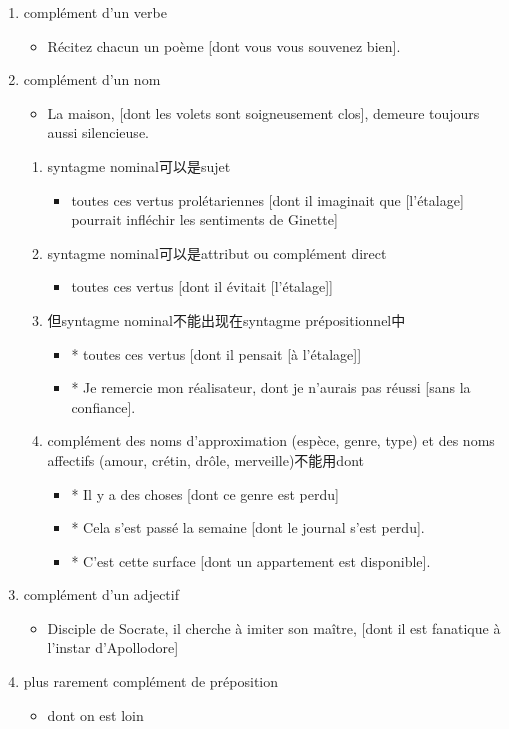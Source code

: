 \documentclass[UTF8]{report}
\begin{document}
\begin{enumerate}
    \item complément d’un verbe
    \begin{itemize}
        \item Récitez chacun un poème [dont vous vous souvenez bien].
    \end{itemize}
    \item complément d’un nom
    \begin{itemize}
        \item La maison, [dont les volets sont soigneusement clos], demeure toujours aussi silencieuse.
    \end{itemize}
    \begin{enumerate}
        \item syntagme nominal可以是sujet
        \begin{itemize}
            \item toutes ces vertus prolétariennes [dont il imaginait que [l’étalage] pourrait infléchir les sentiments de Ginette]
        \end{itemize}
        \item syntagme nominal可以是attribut ou complément direct
        \begin{itemize}
            \item toutes ces vertus [dont il évitait [l’étalage]]
        \end{itemize}
        \item 但syntagme nominal不能出现在syntagme prépositionnel中
        \begin{itemize}
            \item * toutes ces vertus [dont il pensait [à l’étalage]]
            \item * Je remercie mon réalisateur, dont je n’aurais pas réussi [sans la confiance].
        \end{itemize}
        \item complément des noms d’approximation (espèce, genre, type) et des noms affectifs (amour, crétin, drôle, merveille)不能用dont
        \begin{itemize}
            \item * Il y a des choses [dont ce genre est perdu]
            \item * Cela s’est passé la semaine [dont le journal s’est perdu].
            \item * C’est cette surface [dont un appartement est disponible].
        \end{itemize}
    \end{enumerate}
    \item complément d’un adjectif
    \begin{itemize}
        \item Disciple de Socrate, il cherche à imiter son maître, [dont il est fanatique à l’instar d’Apollodore]
    \end{itemize}
    \item plus rarement complément de préposition
    \begin{itemize}
        \item dont on est loin
    \end{itemize}
\end{enumerate}
\end{document}
